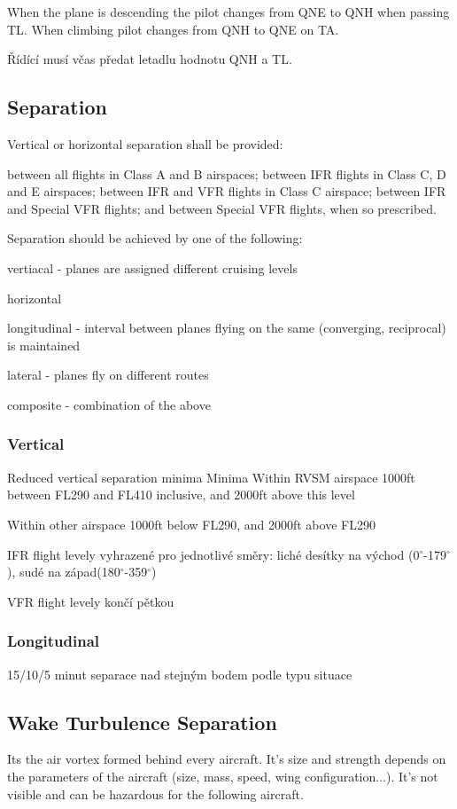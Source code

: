 When the plane is descending the pilot changes from QNE to QNH when passing TL. When climbing pilot changes from QNH to QNE on TA.

Řídící musí včas předat letadlu hodnotu QNH a TL.

\subsection{Separation}
Vertical or horizontal separation shall be provided:

between all flights in Class A and B airspaces;
between IFR flights in Class C, D and E airspaces;
between IFR and VFR flights in Class C airspace;
between IFR and Special VFR flights; and
between Special VFR flights, when so prescribed.
\cite[Chapter 5.2]{doc4444}

Separation should be achieved by one of the following:
\bitem
\item vertiacal - planes are assigned different cruising levels
\item horizontal
	\bitem
	\item longitudinal - interval between planes flying on the same (converging, reciprocal) is maintained
	\item lateral - planes fly on different routes
	\eitem
\item composite - combination of the above
\eitem
\cite[Chapter 3.3]{doc4444}

\subsubsection{Vertical}
Reduced vertical separation minima
Minima
Within RVSM airspace 
1000ft between FL290 and FL410 inclusive, and
2000ft above this level

Within other airspace
1000ft below FL290, and
2000ft above FL290

IFR flight levely vyhrazené pro jednotlivé směry: liché desítky na východ (0$^{\circ}$-179$^{\circ}$), sudé na západ(180$^{\circ}$-359$^{\circ}$)

VFR flight levely končí pětkou

\subsubsection{Longitudinal}
15/10/5 minut separace nad stejným bodem podle typu situace 
\cite[Chapter 5.4.2.2]{doc4444}

\subsection{Wake Turbulence Separation}
Its the air vortex formed behind every aircraft. It's size and strength depends on the parameters of the aircraft (size, mass, speed, wing configuration...). It's not visible and can be hazardous for the following aircraft.

